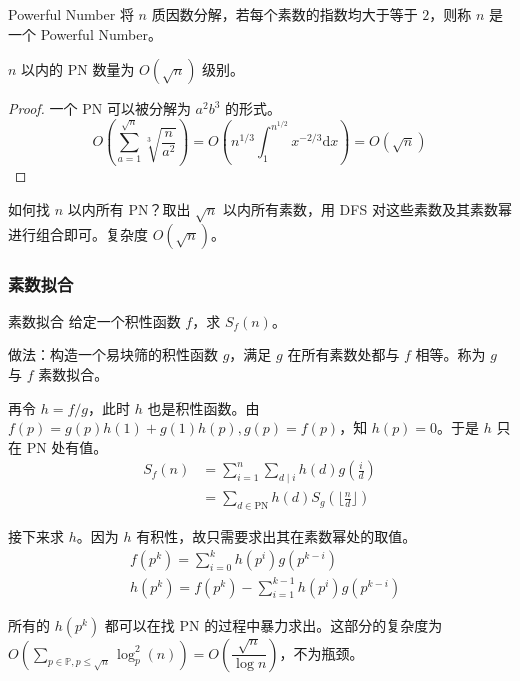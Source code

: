 \documentclass[../main.tex]{subfiles}
\begin{document}
\begin{frame}{Powerful Number}
将 $n$ 质因数分解，若每个素数的指数均大于等于 $2$，则称 $n$ 是一个 Powerful Number。\pause

\begin{theo}
$n$ 以内的 PN 数量为 $O(\sqrt n)$ 级别。
\end{theo}\pause

\begin{proof}
一个 PN 可以被分解为 $a^2b^3$ 的形式。
$$
O(\sum_{a=1}^{\sqrt n}\sqrt[3]{\frac{n}{a^2}})=O(n^{1/3}\int_{1}^{n^{1/2}}x^{-2/3}\mathrm{d}x)=O(\sqrt n)
$$
\end{proof}
\end{frame}

\begin{frame}
如何找 $n$ 以内所有 PN？取出 $\sqrt n$ 以内所有素数，用 DFS 对这些素数及其素数幂进行组合即可。复杂度 $O(\sqrt n)$。
\end{frame}

\subsubsection{素数拟合}

\begin{frame}{素数拟合}
给定一个积性函数 $f$，求 $S_f(n)$。\pause

做法：构造一个易块筛的积性函数 $g$，满足 $g$ 在所有素数处都与 $f$ 相等。称为 $g$ 与 $f$ 素数拟合。\pause

再令 $h=f/g$，此时 $h$ 也是积性函数。由 $f(p)=g(p)h(1)+g(1)h(p),g(p)=f(p)$，知 $h(p)=0$。于是 $h$ 只在 PN 处有值。\pause
$$
\begin{aligned}
S_f(n)&=\sum_{i=1}^n\sum_{d\mid i}h(d)g(\frac{i}{d})\\
&=\sum_{d\in \text{PN}}h(d)S_g(\lfloor\frac{n}{d}\rfloor)
\end{aligned}
$$
\end{frame}

\begin{frame}
接下来求 $h$。因为 $h$ 有积性，故只需要求出其在素数幂处的取值。\pause
$$
\begin{aligned}
& f(p^k)=\sum_{i=0}^kh(p^i)g(p^{k-i})\\
& h(p^k)=f(p^k)-\sum_{i=1}^{k-1}h(p^i)g(p^{k-i})
\end{aligned}
$$\pause

所有的 $h(p^k)$ 都可以在找 PN 的过程中暴力求出。这部分的复杂度为 $O(\sum\limits_{p\in\mathbb{P},p\le \sqrt n}\log_p^2(n))=O(\dfrac{\sqrt n}{\log n})$，不为瓶颈。
\end{frame}
\end{document}
